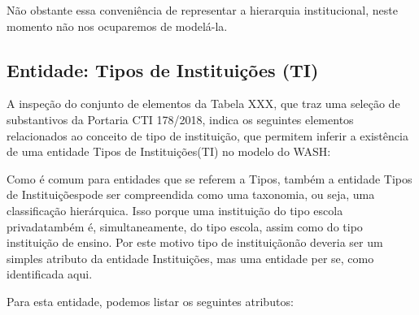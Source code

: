 \documentclass[
12pt,		%
openright,	%
twoside,  %
a4paper,			%
chapter=TITLE,		%
english,			%
french,				%
spanish,			%
brazil				%
]{USPSC-classe/USPSC}
\begin{document}
N\~ao obstante essa conveni\^encia de representar a hierarquia institucional, neste momento n\~ao nos ocuparemos de model\'a-la.










\subsection[Entidade: Tipos de Institui\c{c}\~oes (TI)]{Entidade: Tipos de Institui\c{c}\~oes (TI)}\label{Entidade: Tipos de Institui\c{c}\~oes (TI)}
A inspe\c{c}\~ao do conjunto de elementos da Tabela XXX, que traz uma sele\c{c}\~ao de substantivos da Portaria CTI 178/2018, indica os seguintes elementos relacionados ao conceito de \textquotedbl tipo de institui\c{c}\~ao\textquotedbl , que permitem inferir a exist\^encia de uma entidade \textquotedbl Tipos de Institui\c{c}\~oes\textquotedbl  (TI) no modelo do WASH:











\noindent\begin{center}\mbox{\centering{}}\end{center}


Como \'e comum para entidades que se referem a \textquotedbl Tipos\textquotedbl , tamb\'em a entidade \textquotedbl Tipos de Institui\c{c}\~oes\textquotedbl  pode ser compreendida como uma taxonomia, ou seja, uma classifica\c{c}\~ao hier\'arquica. Isso porque uma institui\c{c}\~ao do tipo \textquotedbl escola privada\textquotedbl  tamb\'em \'e, simultaneamente, do tipo \textquotedbl escola\textquotedbl , assim como do tipo \textquotedbl institui\c{c}\~ao de ensino\textquotedbl . Por este motivo \textquotedbl tipo de institui\c{c}\~ao\textquotedbl  n\~ao deveria ser um simples atributo da entidade \textquotedbl Institui\c{c}\~oes\textquotedbl , mas uma entidade per se, como identificada aqui.










Para esta entidade, podemos listar os seguintes atributos:
\end{document}
